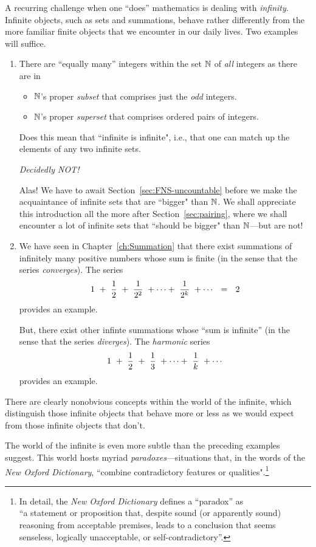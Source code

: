 A recurring challenge when one ``does'' mathematics is dealing with {\em infinity}.  Infinite objects, such as sets and summations, behave rather differently from the more familiar finite objects that we encounter in our daily lives.  Two examples will suffice.  
\begin{enumerate}
\item
There are ``equally many'' integers within the set $\mathbb{N}$ of {\em all} integers as there are in
  \begin{itemize}
  \item
$\mathbb{N}$'s proper {\em subset} that comprises just the {\em odd} integers.
  \item
$\mathbb{N}$'s proper {\em superset} that comprises ordered pairs of integers.
  \end{itemize}
Does this mean that ``infinite is infinite", i.e., that one can match up the elements of any two infinite sets.
  
\smallskip

\noindent
{\em Decidedly NOT!}

\smallskip

\noindent
Alas!  We have to await Section~\ref{sec:FNS-uncountable} before we make the acquaintance of infinite sets that are ``bigger" than $\mathbb{N}$.  We shall appreciate this introduction all the more after Section~\ref{sec:pairing}, where we shall encounter a lot of infinite sets that ``should be bigger" than $\mathbb{N}$---but are not! 


\item
We have seen in Chapter~\ref{ch:Summation} that there exist summations of infinitely many positive numbers whose sum is finite (in the sense that the series {\em converges}).  The series
\[ 1 \ + \ {1 \over 2} \ + \ {1 \over 2^2} \ + \cdots + \ {1 \over 2^k} \ + \cdots \ \ = \ \ 2 \]
provides an example.

\smallskip

But, there exist other infinte summations whose ``sum is infinite'' (in the sense that the series {\em diverges}).  The {\it harmonic} series
\[ 1 \ + \ {1 \over 2} \ + \ {1 \over 3} \ + \cdots + \ {1 \over k} \ + \cdots \]
provides an example.
\end{enumerate}
There are clearly nonobvious concepts within the world of the infinite, which distinguish those infinite objects that behave more or less as we would expect from those infinite objects that don't.

\medskip

The world of the infinite is even more subtle than the preceding examples suggest.  This world hosts myriad {\em paradoxes}---situations that, in the words of the {\it New Oxford Dictionary}, ``combine contradictory features or qualities".\footnote{In detail, the {\it New Oxford Dictionary} defines a ``paradox'' as \\
``a statement or proposition that, despite sound (or apparently sound) reasoning from acceptable premises, leads to a conclusion that seems senseless, logically unacceptable, or self-contradictory''.}

